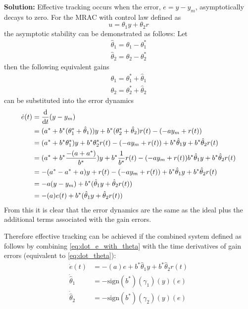 \documentclass[letter]{article}
\begin{document}
\noindent
\textbf{Solution:}
Effective tracking occurs when the error, $e = y - y_m$, asymptotically decays to zero. For the MRAC with control law defined as $$u=\theta_1 y + \theta_2 r$$ the asymptotic stability can be demonstrated as follows:
Let
\begin{align}
	\hat{\theta}_1 = \theta_1 - \theta_1^*\\
	\hat{\theta}_2 = \theta_2 - \theta_2^*
\end{align}
then the following equivalent gains
\begin{align}
	\theta_1 = \theta_1^* + \hat{\theta}_1\\
	\theta_2 = \theta_2^* + \hat{\theta}_2
\end{align}
can be substituted into the error dynamics
\begin{align}
	\dot{e}(t) &= \dv{t} (y - y_m)\\
	&= (a^* + b^* (\theta_1^* + \hat{\theta}_1)) y + b^* (\theta_2^* + \hat{\theta}_2) r(t) - ( -a y_m + r(t))\\
	&=(a^* + b^* \theta_1^*) y + b^* \theta_2^* r(t) - ( -a y_m + r(t)) + b^* \hat{\theta}_1 y + b^* \hat{\theta}_2 r(t)\\
	&= (a^* + b^* \frac{-(a + a^*)}{b^*}) y + b^* \frac{1}{b^*} r(t) - ( -a y_m + r(t)) b^* \hat{\theta}_1 y + b^* \hat{\theta}_2 r(t)\\
	&= -(a^* - a^* + a)y + r(t) - (-a y_m + r(t)) + b^* \hat{\theta}_1 y + b^* \hat{\theta}_2 r(t)\\
	&= -a(y-y_m) + b^* (\hat{\theta}_1 y + \hat{\theta}_2 r(t))\\
	&= -(a)e(t) + b^* (\hat{\theta}_1 y + \hat{\theta}_2 r(t)) \label{eq:dot_e_with_theta}
\end{align}
From this it is clear that the error dynamics are the same as the ideal plus the additional terms associated with the gain errors.

Therefore effective tracking can be achieved if the combined system defined as follows by combining \eqref{eq:dot_e_with_theta} with the time derivatives of gain errors (equivalent to \eqref{eq:dot_theta}):
\begin{equation}\label{eq:addaptive_error_dynamics}
	\begin{aligned}
		\dot{e}(t) &= -(a)e + b^* \hat{\theta}_1 y + b^* \hat{\theta}_2 r(t)\\
		\dot{\hat{\theta}}_1 &= - \text{sign}(b^*) (\gamma_1) (y) (e)\\
		\dot{\hat{\theta}}_2 &= - \text{sign}(b^*) (\gamma_2) (y) (e)
	\end{aligned}
\end{equation}
\end{document}

